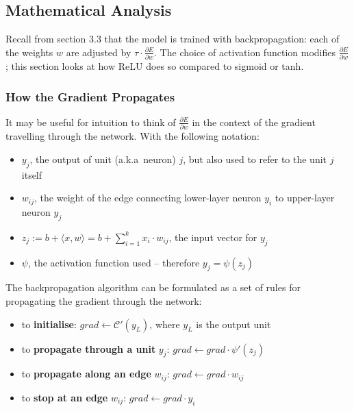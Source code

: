 \documentclass[a4paper,11pt]{article}
\begin{document}
\subsection{Mathematical Analysis}

Recall from section 3.3 that the model is trained with backpropagation: each of the weights $w$ are adjusted by $\tau \cdot \frac{\partial{E}}{\partial{w}}$. The choice of activation function modifies $\frac{\partial{E}}{\partial{w}}$; this section looks at how ReLU does so compared to sigmoid or tanh. \\

\subsubsection{How the Gradient Propagates}

It may be useful for intuition to think of $\frac{\partial{E}}{\partial{w}}$ in the context of the gradient travelling through the network. With the following notation:
\begin{itemize}
\item $y_{j}$, the output of unit (a.k.a\ neuron) $j$, but also used to refer to the unit $j$ itself
\item $w_{ij}$, the weight of the edge connecting lower-layer neuron $y_{i}$ to upper-layer neuron $y_{j}$
\item $z_{j} := b+ \langle x,w \rangle = b + \sum\limits_{i=1}^k x_{i}\cdot w_{ij}$, the input vector for $y_{j}$
\item $\psi$, the activation function used -- therefore $y_{j} = \psi(z_{j})$ \\
\end{itemize}

The backpropagation algorithm can be formulated as a set of rules for propagating the gradient through the network:
\begin{itemize}
\renewcommand\labelitemi{--}
\item to \textbf{initialise}: $grad \leftarrow \mathcal{C}'(y_{L})$, where $y_{L}$ is the output unit
\item to \textbf{propagate through a unit} $y_{j}$: $grad \leftarrow grad \cdot \psi'(z_{j})$
\item to \textbf{propagate along an edge} $w_{ij}$: $grad \leftarrow grad \cdot w_{ij}$
\item to \textbf{stop at an edge} $w_{ij}$: $grad \leftarrow grad \cdot y_{i}$ \\
\end{itemize}
\end{document}
